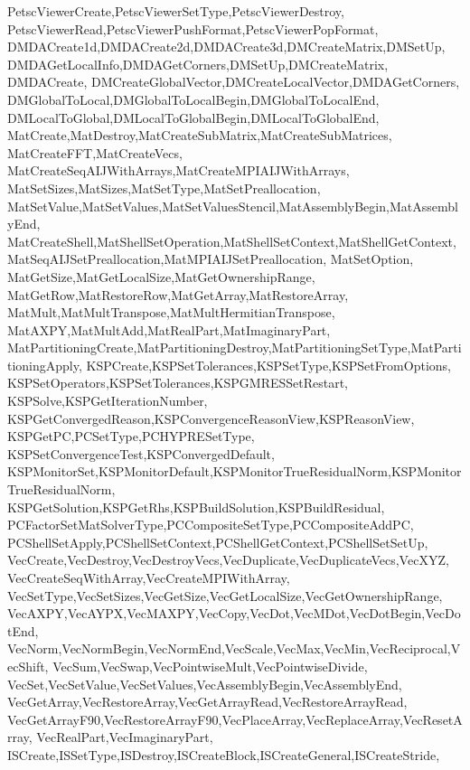 {{{{{    PetscViewerCreate,PetscViewerSetType,PetscViewerDestroy,
    PetscViewerRead,PetscViewerPushFormat,PetscViewerPopFormat,
    DMDACreate1d,DMDACreate2d,DMDACreate3d,DMCreateMatrix,DMSetUp,
    DMDAGetLocalInfo,DMDAGetCorners,DMSetUp,DMCreateMatrix,
    DMDACreate, %
    DMCreateGlobalVector,DMCreateLocalVector,DMDAGetCorners,
    DMGlobalToLocal,DMGlobalToLocalBegin,DMGlobalToLocalEnd,
    DMLocalToGlobal,DMLocalToGlobalBegin,DMLocalToGlobalEnd,
    MatCreate,MatDestroy,MatCreateSubMatrix,MatCreateSubMatrices,
    MatCreateFFT,MatCreateVecs,
    MatCreateSeqAIJWithArrays,MatCreateMPIAIJWithArrays,
    MatSetSizes,MatSizes,MatSetType,MatSetPreallocation,
    MatSetValue,MatSetValues,MatSetValuesStencil,MatAssemblyBegin,MatAssemblyEnd,
    MatCreateShell,MatShellSetOperation,MatShellSetContext,MatShellGetContext,
    MatSeqAIJSetPreallocation,MatMPIAIJSetPreallocation,    
    MatSetOption,
    MatGetSize,MatGetLocalSize,MatGetOwnershipRange,
    MatGetRow,MatRestoreRow,MatGetArray,MatRestoreArray,
    MatMult,MatMultTranspose,MatMultHermitianTranspose,
    MatAXPY,MatMultAdd,MatRealPart,MatImaginaryPart,
    MatPartitioningCreate,MatPartitioningDestroy,MatPartitioningSetType,MatPartitioningApply,
    KSPCreate,KSPSetTolerances,KSPSetType,KSPSetFromOptions,
    KSPSetOperators,KSPSetTolerances,KSPGMRESSetRestart,
    KSPSolve,KSPGetIterationNumber,
    KSPGetConvergedReason,KSPConvergenceReasonView,KSPReasonView,
    KSPGetPC,PCSetType,PCHYPRESetType,
    KSPSetConvergenceTest,KSPConvergedDefault,
    KSPMonitorSet,KSPMonitorDefault,KSPMonitorTrueResidualNorm,KSPMonitorTrueResidualNorm,
    KSPGetSolution,KSPGetRhs,KSPBuildSolution,KSPBuildResidual,
    PCFactorSetMatSolverType,PCCompositeSetType,PCCompositeAddPC,
    PCShellSetApply,PCShellSetContext,PCShellGetContext,PCShellSetSetUp,
    VecCreate,VecDestroy,VecDestroyVecs,VecDuplicate,VecDuplicateVecs,VecXYZ,
    VecCreateSeqWithArray,VecCreateMPIWithArray,
    VecSetType,VecSetSizes,VecGetSize,VecGetLocalSize,VecGetOwnershipRange,
    VecAXPY,VecAYPX,VecMAXPY,VecCopy,VecDot,VecMDot,VecDotBegin,VecDotEnd,
    VecNorm,VecNormBegin,VecNormEnd,VecScale,VecMax,VecMin,VecReciprocal,VecShift,
    VecSum,VecSwap,VecPointwiseMult,VecPointwiseDivide,
    VecSet,VecSetValue,VecSetValues,VecAssemblyBegin,VecAssemblyEnd,
    VecGetArray,VecRestoreArray,VecGetArrayRead,VecRestoreArrayRead,
    VecGetArrayF90,VecRestoreArrayF90,VecPlaceArray,VecReplaceArray,VecResetArray,
    VecRealPart,VecImaginaryPart,
    ISCreate,ISSetType,ISDestroy,ISCreateBlock,ISCreateGeneral,ISCreateStride,
}}}}}

